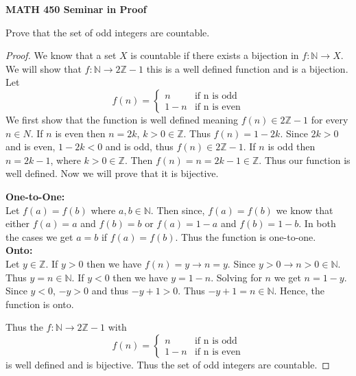 \documentclass[14pt]{article}
\newcommand{\Z}{\mathbb Z}
\newcommand{\N}{\mathbb N}
\begin{document}
\begin{center}
		
{\bf MATH 450 Seminar in Proof}
 \\
\end{center}
	Prove that the set of odd integers are countable.
\begin{proof}
	 We know that a set $X$ is countable if there exists a bijection in $f: \N \rightarrow X$. We will show that $f:\N \rightarrow 2\Z - 1$ this is a well defined function and is a bijection. 
	 Let \[
f(n) =
\begin{cases}
 n & \text{if n is odd} \\
 1 - n & \text{if n is even}
\end{cases}
\]
We first show that the function is well defined meaning $f(n) \in 2\Z - 1 $ for every $n \in N$. If $n$ is even then $n = 2k$, $k > 0 \in \Z$. Thus $f(n) = 1 - 2k$. Since $2k > 0$ and is even, $1 - 2k < 0$ and is odd, thus $f(n) \in 2\Z - 1$. If $n$ is odd then $n = 2k - 1$, where $k > 0 \in \Z$. Then $f(n) = n = 2k - 1 \in \Z$. Thus our function is well defined. Now we will prove that it is bijective.

\textbf{One-to-One: \\}
Let $f(a) = f(b)$ where $a,b \in \N$. Then since, $f(a)= f(b)$ we know that either $f(a) = a$ and $f(b) = b$ or $f(a) = 1 - a$ and $f(b) = 1 - b$. In both the cases we get $a=b$ if $f(a) = f(b)$. Thus the function is one-to-one.\\ \textbf{Onto: \\}
Let $y \in \Z$. If $y > 0$ then we have $f(n) = y \rightarrow n = y$. Since $y > 0 \rightarrow n > 0 \in \N$. Thus $y = n \in \N$. If $y < 0$ then we have $ y = 1 -n$. Solving for $n$ we get $n = 1 - y$. Since $y <0$, $-y > 0$ and thus $-y + 1 > 0$. Thus $-y+1 = n \in \N$. Hence, the function is onto.

Thus the $f:\N \rightarrow 2\Z - 1$ with \[
f(n) =
\begin{cases}
 n & \text{if n is odd} \\
 1 - n & \text{if n is even}
\end{cases}
\] is well defined and is bijective. Thus the set of odd integers are countable.
\end{proof}
\end{document}
